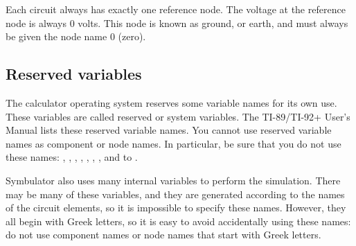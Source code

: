 Each circuit always has exactly one reference node. The voltage at
the reference node is always 0 volts. This node is known as ground,
or earth, and must always be given the node name 0 (zero).

\subsection{Reserved variables}

The calculator operating system reserves some variable names for its
own use. These variables are called reserved or system variables.
The TI-89/TI-92+ User's Manual lists these reserved variable names.
You cannot use reserved variable names as component or node names.
In particular, be sure that you do not use these names: ,
, , , , , ,
and  to .

Symbulator also uses many internal variables to perform the
simulation. There may be many of these variables, and they are
generated according to the names of the circuit elements, so it is
impossible to specify these names. However, they all begin with
Greek letters, so it is easy to avoid accidentally using these
names: do not use component names or node names that start with
Greek letters.
